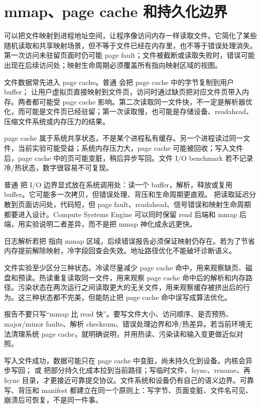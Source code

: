 \section{mmap、page cache 和持久化边界}

 可以把文件映射到进程地址空间，让程序像访问内存一样读取文件。它简化了某些随机读取和共享映射场景，但不等于文件已经在内存里，也不等于错误处理消失。第一次访问未驻留页面时仍可能 page fault；文件被截断或读取失败时，错误可能出现在后续访问处；映射生命周期必须覆盖所有指向映射区域的视图。

文件数据常先进入 page cache。普通  会把 page cache 中的字节复制到用户 buffer； 让用户虚拟页直接映射到文件页，访问时通过缺页把对应文件页带入内存。两者都可能受 page cache 影响。第二次读取同一文件快，不一定是解析器优化，而可能是文件页已经驻留；第一次读取慢，也可能是存储设备、readahead、压缩文件系统或内存压力的结果。

page cache 属于系统共享状态，不是某个进程私有缓存。另一个进程读过同一文件，当前实验可能受益；系统内存压力大，page cache 可能被回收；写入文件后，page cache 中的页可能变脏，稍后异步写回。文件 I/O benchmark 若不记录冷/热状态，数字很容易不可复现。

普通  把 I/O 边界显式放在系统调用处：读一个 buffer，解析，释放或复用 buffer。它可能多一次拷贝，但错误处理、背压和生命周期更直观。 把读取延迟分散到页面访问处，代码短，但 page fault、readahead、信号错误和映射生命周期都要进入设计。Compute Systems Engine 可以同时保留 read 后端和 mmap 后端，用实验说明二者差异，而不是把 mmap 神化成永远更快。

日志解析若把  指向 mmap 区域，后续错误报告必须保证映射仍存在。若为了节省内存提前解除映射，冷字段回查会失效。地址路径优化不能破坏诊断语义。

文件实验至少区分三种状态。冷读尽量减少 page cache 命中，用来观察缺页、磁盘和预读。热读重复读取同一文件，用来观察 page cache 命中后的解析和内存路径。污染状态在两次运行之间读取更大的无关文件，用来观察缓存被挤出后的行为。这三种状态都不完美，但能防止把 page cache 命中误写成算法优化。

报告不要只写“mmap 比 read 快”。要写文件大小、访问顺序、是否预热、major/minor faults、解析 checksum、错误处理边界和冷/热差异。若当前环境无法清理系统 page cache，就明确说明，并用热读、污染读和输入变更做近似对照。

写入文件成功，数据可能只在 page cache 中变脏，尚未持久化到设备。内核会异步写回； 或  把部分持久化成本拉到当前路径；写临时文件、fsync、rename、再 fsync 目录，才更接近可靠提交协议。文件系统和设备仍有自己的语义边界。可靠写、背压和 manifest 都建立在同一个原则上：写字节、页面变脏、文件名可见、崩溃后可恢复，不是同一件事。

